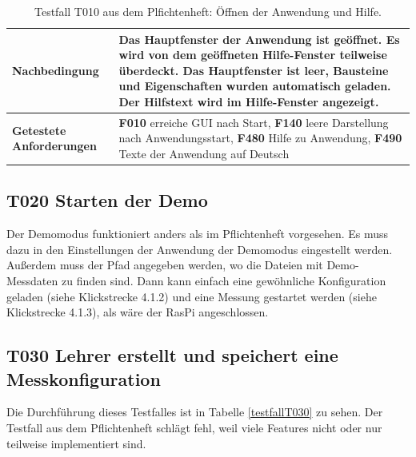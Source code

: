 \documentclass[parskip=full]{scrartcl}
\begin{document}
\begin{table}[h]
\begin{tabular}{| p{4cm} | p{10cm} |}
	\textbf{Nachbedingung}
	& 
	Das Hauptfenster der Anwendung ist geöffnet. Es wird von dem geöffneten Hilfe-Fenster teilweise überdeckt. Das Hauptfenster ist leer, Bausteine und Eigenschaften wurden automatisch geladen. Der Hilfstext wird im Hilfe-Fenster angezeigt.
	\\ \hline
	
	
	\textbf{Getestete Anforderungen}
	& 
	\textbf{F010} erreiche GUI nach Start, \textbf{F140} leere Darstellung nach Anwendungsstart, \textbf{F480} Hilfe zu Anwendung, \textbf{F490} Texte der Anwendung auf Deutsch
	\\ \hline
	
	
	
\end{tabular}
\caption{Testfall T010 aus dem Plfichtenheft: Öffnen der Anwendung und Hilfe.}
\label{testfallT010}
\end{table}




\subsection{\textbf{T020} Starten der Demo}

Der Demomodus funktioniert anders als im Pflichtenheft vorgesehen. Es muss dazu in den Einstellungen der Anwendung der Demomodus eingestellt werden. Außerdem muss der Pfad angegeben werden, wo die Dateien mit Demo-Messdaten zu finden sind.  Dann kann einfach eine gewöhnliche Konfiguration geladen (siehe Klickstrecke 4.1.2) und eine Messung gestartet werden (siehe Klickstrecke 4.1.3), als wäre der \gls{RasPi} angeschlossen.


\subsection{\textbf{T030} Lehrer erstellt und speichert eine Messkonfiguration}
Die Durchführung dieses Testfalles ist in Tabelle \ref{testfallT030} zu sehen. Der Testfall aus dem Pflichtenheft schlägt fehl, weil viele Features nicht oder nur teilweise implementiert sind.
\end{document}
